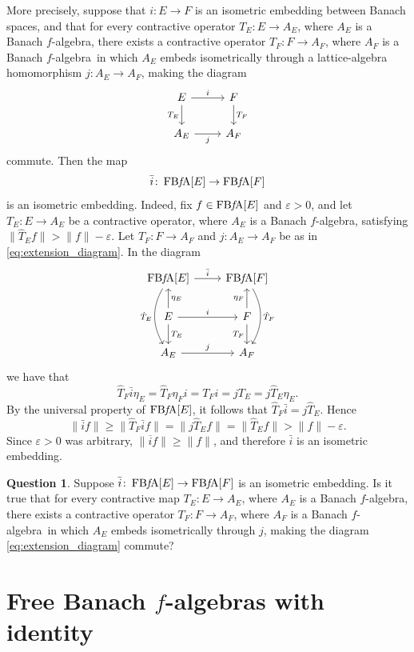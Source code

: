 \documentclass{memo-l}
\theoremstyle{definition}
\newtheorem{question}[theorem]{Question}
\theoremstyle{remark}
\numberwithin{section}{chapter}
\numberwithin{equation}{chapter}
\newcommand{\falg}{$f\!$-algebra}
\newcommand{\FBFA}[1]{\operatorname{FB{\it f}\!A}[#1]}
\begin{document}
More precisely, suppose that $i\colon E\to F$ is an isometric
embedding between Banach spaces, and that for every contractive
operator $T_E\colon E\to A_E$, where $A_E$ is a Banach \falg, there
exists a contractive operator $T_F\colon F\to A_F$, where $A_F$ is a
Banach \falg\ in which $A_E$ embeds isometrically through a
lattice-algebra homomorphism $j\colon
A_E\to A_F$, making the diagram
\begin{equation}\label{eq:extension_diagram}
\begin{tikzcd}
    E\arrow[r, "i"]\arrow[d, "T_E"']&F\arrow[d,"T_F"]\\
    A_E\arrow[r, "j"']&A_F
\end{tikzcd}
\end{equation}
commute. Then the map
\[
\bar{i}\colon \FBFA E\to \FBFA F
\]
is an isometric embedding. Indeed, fix $f \in \FBFA E$ and
$\varepsilon >0$, and let $T_E\colon E\to A_E$ be a contractive
operator, where $A_E$ is a Banach \falg, satisfying
$\|\hat{T}_Ef\| > \|f\|-\varepsilon$. Let $T_F\colon F\to A_F$ and
$j\colon A_E\to A_F$ be as in \eqref{eq:extension_diagram}. In the diagram
\[
\begin{tikzcd}
    \FBFA E \arrow[r, "\bar{i}"]\arrow[dd,
    "\hat{T}_E"', bend right]&\FBFA F\arrow[dd, "\hat{T}_F", bend
    left]\\
    E\arrow[u, "\eta _E"']\arrow[r, "i"]\arrow[d, "T_E"]&
    F\arrow[u, "\eta _F"]\arrow[d, "T_F"']\\
    A_E\arrow[r, "j"]&A_F
\end{tikzcd}
\]
we have that
\[
    \hat{T}_F\bar{i}\eta _E=\hat{T}_F\eta _F
    i=T_Fi=jT_E=j\hat{T}_E\eta _E.
\]
By the universal property of $\FBFA E$, it follows that
$\hat{T}_F\bar{i}=j\hat{T}_E$. Hence
\[
\|\bar{i}f\|\ge
\|\hat{T}_F\bar{i}f\|=\|j\hat{T}_Ef\|=\|\hat{T}_Ef\|>\|f\|-\varepsilon .
\]
Since $\varepsilon >0$ was arbitrary, $\|\overline{i}f\|\ge \|f\|$,
and therefore $\bar{i}$ is an isometric embedding.

\begin{question}
    Suppose $\bar{i}\colon \FBFA E\to \FBFA F$ is an isometric
    embedding. Is it true that for every contractive map $T_E\colon
    E\to A_E$, where $A_E$ is a Banach \falg, there exists a
    contractive operator $T_F\colon F\to A_F$, where $A_F$ is a
    Banach \falg\ in which $A_E$ embeds isometrically through $j$,
    making the diagram \eqref{eq:extension_diagram} commute?
\end{question}

\section{Free Banach \texorpdfstring{$f$-algebras}{f-algebras} with identity}
\label{sec:identity}
\end{document}
